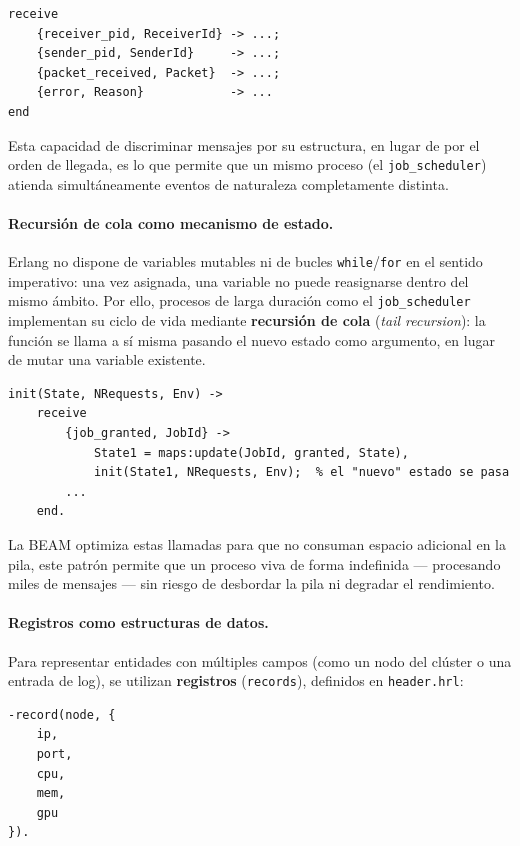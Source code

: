 \documentclass[12pt,a4paper]{article}
\begin{document}
\begin{lstlisting}
receive
    {receiver_pid, ReceiverId} -> ...;
    {sender_pid, SenderId}     -> ...;
    {packet_received, Packet}  -> ...;
    {error, Reason}            -> ...
end
\end{lstlisting}
 
Esta capacidad de discriminar mensajes por su estructura, en lugar de por el orden de llegada, es lo que permite que un mismo proceso (el \texttt{job\_scheduler}) atienda simultáneamente eventos de naturaleza completamente distinta.
 
\paragraph{Recursión de cola como mecanismo de estado.}
Erlang no dispone de variables mutables ni de bucles \texttt{while}/\texttt{for} en el sentido imperativo: una vez asignada, una variable no puede reasignarse dentro del mismo ámbito. Por ello, procesos de larga duración como el \texttt{job\_scheduler} implementan su ciclo de vida mediante \textbf{recursión de cola} (\emph{tail recursion}): la función se llama a sí misma pasando el nuevo estado como argumento, en lugar de mutar una variable existente.
 
\begin{lstlisting}
init(State, NRequests, Env) ->
    receive
        {job_granted, JobId} ->
            State1 = maps:update(JobId, granted, State),
            init(State1, NRequests, Env);  % el "nuevo" estado se pasa
        ...
    end.
\end{lstlisting}
 
La BEAM optimiza estas llamadas para que no consuman espacio adicional en la pila, este patrón permite que un proceso viva de forma indefinida --- procesando miles de mensajes --- sin riesgo de desbordar la pila ni degradar el rendimiento.
 
\paragraph{Registros como estructuras de datos.}
Para representar entidades con múltiples campos (como un nodo del clúster o una entrada de log), se utilizan \textbf{registros} (\texttt{records}), definidos en \texttt{header.hrl}:
 
\begin{lstlisting}
-record(node, {
    ip,
    port,
    cpu,
    mem,
    gpu
}).
\end{lstlisting}
 
\end{document}
